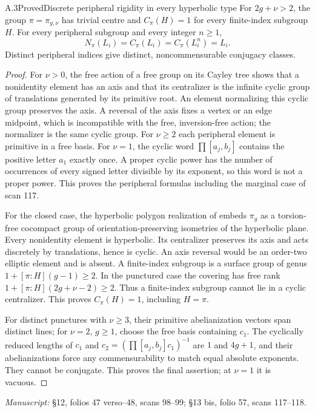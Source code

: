 \begin{claim}{A.3}{Proved}{Discrete peripheral rigidity in every hyperbolic type}
For $2g+\nu>2$, the group $\pi=\pi_{g,\nu}$ has trivial centre and $C_\pi(H)=1$ for every finite-index subgroup $H$. For every peripheral subgroup and every integer $n\ge1$,
\[
 N_\pi(L_i)=C_\pi(L_i)=C_\pi(L_i^n)=L_i.
\]
Distinct peripheral indices give distinct, noncommensurable conjugacy classes.
\end{claim}
\begin{proof}
For $\nu>0$, the free action of a free group on its Cayley tree shows that a nonidentity element has an axis and that its centralizer is the infinite cyclic group of translations generated by its primitive root. An element normalizing this cyclic group preserves the axis. A reversal of the axis fixes a vertex or an edge midpoint, which is incompatible with the free, inversion-free action; the normalizer is the same cyclic group. For $\nu\ge2$ each peripheral element is primitive in a free basis. For $\nu=1$, the cyclic word $\prod[a_j,b_j]$ contains the positive letter $a_1$ exactly once. A proper cyclic power has the number of occurrences of every signed letter divisible by its exponent, so this word is not a proper power. This proves the peripheral formulas including the marginal case of scan 117.

For the closed case, the hyperbolic polygon realization of \cite[Theorem 1.2]{A_FarbMargalit2012} embeds $\pi_g$ as a torsion-free cocompact group of orientation-preserving isometries of the hyperbolic plane. Every nonidentity element is hyperbolic. Its centralizer preserves its axis and acts discretely by translations, hence is cyclic. An axis reversal would be an order-two elliptic element and is absent. A finite-index subgroup is a surface group of genus $1+[\pi:H](g-1)\ge2$. In the punctured case the covering has free rank $1+[\pi:H](2g+\nu-2)\ge2$. Thus a finite-index subgroup cannot lie in a cyclic centralizer. This proves $C_\pi(H)=1$, including $H=\pi$.

For distinct punctures with $\nu\ge3$, their primitive abelianization vectors span distinct lines; for $\nu=2$, $g\ge1$, choose the free basis containing $c_1$. The cyclically reduced lengths of $c_1$ and $c_2=(\prod[a_j,b_j]c_1)^{-1}$ are $1$ and $4g+1$, and their abelianizations force any commensurability to match equal absolute exponents. They cannot be conjugate. This proves the final assertion; at $\nu=1$ it is vacuous.
\end{proof}
\noindent\emph{Manuscript:} \S12, folios 47 verso--48, scans 98--99; \S13 bis, folio 57, scans 117--118.

